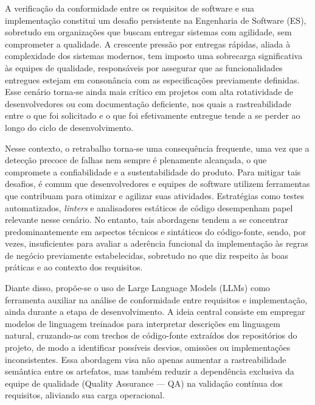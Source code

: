 \label{cap:introducao}

A verificação da conformidade entre os requisitos de software e sua implementação constitui um desafio persistente na Engenharia de Software (ES), sobretudo em organizações que buscam entregar sistemas com agilidade, sem comprometer a qualidade. A crescente pressão por entregas rápidas, aliada à complexidade dos sistemas modernos, tem imposto uma sobrecarga significativa às equipes de qualidade, responsáveis por assegurar que as funcionalidades entregues estejam em consonância com as especificações previamente definidas. Esse cenário torna-se ainda mais crítico em projetos com alta rotatividade de desenvolvedores ou com documentação deficiente, nos quais a rastreabilidade entre o que foi solicitado e o que foi efetivamente entregue tende a se perder ao longo do ciclo de desenvolvimento.

Nesse contexto, o retrabalho torna-se uma consequência frequente, uma vez que a detecção precoce de falhas nem sempre é plenamente alcançada, o que compromete a confiabilidade e a sustentabilidade do produto. Para mitigar tais desafios, é comum que desenvolvedores e equipes de software utilizem ferramentas que contribuam para otimizar e agilizar suas atividades. Estratégias como testes automatizados, \textit{linters} e analisadores estáticos de código desempenham papel relevante nesse cenário. No entanto, tais abordagens tendem a se concentrar predominantemente em aspectos técnicos e sintáticos do código-fonte, sendo, por vezes, insuficientes para avaliar a aderência funcional da implementação às regras de negócio previamente estabelecidas, sobretudo no que diz respeito às boas práticas e ao contexto dos requisitos.

Diante disso, propõe-se o uso de Large Language Models (LLMs) como ferramenta auxiliar na análise de conformidade entre requisitos e implementação, ainda durante a etapa de desenvolvimento. A ideia central consiste em empregar modelos de linguagem treinados para interpretar descrições em linguagem natural, cruzando-as com trechos de código-fonte extraídos dos repositórios do projeto, de modo a identificar possíveis desvios, omissões ou implementações inconsistentes. Essa abordagem visa não apenas aumentar a rastreabilidade semântica entre os artefatos, mas também reduzir a dependência exclusiva da equipe de qualidade (Quality Assurance — QA) na validação contínua dos requisitos, aliviando sua carga operacional.

